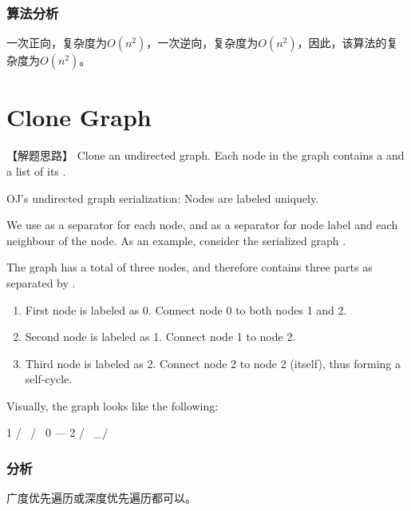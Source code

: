 \subsubsection{算法分析}
一次正向，复杂度为$O(n^2)$，一次逆向，复杂度为$O(n^2)$，因此，该算法的复杂度为$O(n^2)$。


\section{Clone Graph} %
\label{sec:clone-graph}


【解题思路】
Clone an undirected graph. Each node in the graph contains a  and a list of its .


OJ's undirected graph serialization:
Nodes are labeled uniquely.

We use \code{\#} as a separator for each node, and \code{,} as a separator for node label and each neighbour of the node.
As an example, consider the serialized graph .

The graph has a total of three nodes, and therefore contains three parts as separated by \code{\#}.
\begin{enumerate}
	\item First node is labeled as 0. Connect node 0 to both nodes 1 and 2.
	\item Second node is labeled as 1. Connect node 1 to node 2.
	\item Third node is labeled as 2. Connect node 2 to node 2 (itself), thus forming a self-cycle.
\end{enumerate}

Visually, the graph looks like the following:
\begin{Code}
	1
	/ \
	/   \
	0 --- 2
	/ \
	\_/
\end{Code}


\subsubsection{分析}
广度优先遍历或深度优先遍历都可以。



